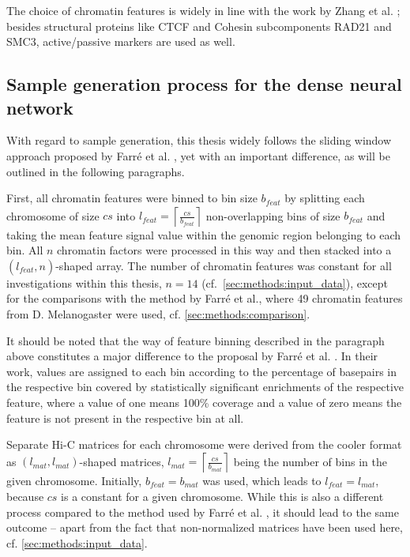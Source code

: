 The choice of chromatin features is widely in line with the work by Zhang et al. \cite{Zhang2019}; 
besides structural proteins like CTCF and Cohesin subcomponents RAD21 and SMC3, active/passive markers are used as well.

\subsection{Sample generation process for the dense neural network} \label{sec:methods:sample_gen}
With regard to sample generation, this thesis widely follows the sliding window approach proposed by Farr\'e et al. \cite{Farre2018a},
yet with an important difference, as will be outlined in the following paragraphs.

First, all chromatin features were binned to bin size $b_\mathit{feat}$ by splitting each chromosome of size $cs$ into 
$l_\mathit{feat}=\left \lceil{\frac{cs}{b_\mathit{feat}}}\right \rceil$ non-overlapping bins of size $b_\mathit{feat}$
and taking the mean feature signal value within the genomic region belonging to each bin.
All $n$ chromatin factors were processed in this way and then stacked into a $(l_\mathit{feat},n)$-shaped array.
The number of chromatin features was constant for all investigations within this thesis, $n=14$ (cf.~\cref{sec:methods:input_data}),
except for the comparisons with the method by Farr\'e et al., where 49 chromatin features from D. Melanogaster were used, cf. \cref{sec:methods:comparison}.

It should be noted that the way of feature binning described in the paragraph above constitutes a major difference to the proposal by Farr\'e et al. \cite[p.~9]{Farre2018a}.
In their work, values are assigned to each bin according to the percentage of basepairs in the respective bin covered by statistically significant enrichments of the respective feature,
where a value of one means 100\% coverage and a value of zero means the feature is not present in the respective bin at all.

Separate Hi-C matrices for each chromosome were derived from the cooler format as $(l_\mathit{mat}, l_\mathit{mat})$-shaped matrices, 
$l_\mathit{mat}=\left \lceil{\frac{cs}{b_\mathit{mat}}}\right \rceil$ being the number of bins in the given chromosome. 
Initially, $b_\mathit{feat} = b_\mathit{mat}$ was used, which leads to $l_\mathit{feat} = l_\mathit{mat}$, because $cs$ is a constant for a given chromosome.
While this is also a different process compared to the method used by Farr\'e et al. \cite[p.~8f]{Farre2018a}, it should lead to the same outcome --
apart from the fact that non-normalized matrices have been used here, cf. \cref{sec:methods:input_data}.

